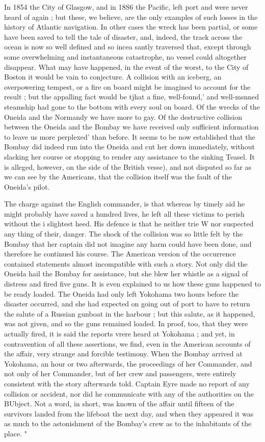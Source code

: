 \documentclass[justified]{tufte-book}
\begin{document}
In 1854 the City of Glasgow, and in 18S6 the Pacific, left port and were never heard of again ; but these, we believe, are the only examples of such losses in the history of Atlantic navigation. In other cases the wreck has been partial, or some have been saved to tell the tale of disaster, and, indeed, the track across the ocean is now so well defined and so incea santly traversed that, except through some overwhelming and instantaneous catastrophe, no vessel could altogether disappear. What may have happened, in the event of the worst, to the City of Boston it would be vain to conjecture. A collision with an iceberg, an overpowering tempest, or a fire on board might be imagined to account for the result ; but the appalling fact would be tjhat a fine, well-found,' and well-msnned steamship had gone to the bottom with every soul on board. Of the wrecks of the Oneida and the Normandy we have more to gay. Of the destructive collision between the Oneida and the Bombay we have received only sufficient information to leave us more perplexed' than before. It seems to be now established that the Bombay did indeed run into the Oneida and cut her down immediately, without slacking her course or stopping to render any assistance to the sinking Teasel. It is alleged, however, on the side of the British vesse), and not disputed so far as we can see by the Americans, that the
collision itself was the fault of the Oneida's pilot. 

The charge against the English commander, is that whereas by timely aid he might probably have saved a hundred lives, he left all these victims to perish without the i slightest heed. His defence is that he neither trie W nor suspected any thing of their, danger. The shock of the collision was so little felt by the Bombay that her captain did not imagine any harm could have been done, and therefore he continued his course. The American version of the occurrence contained statements almost incompatible with such a story. Not only did the Oneida hail the Bombay for assistance, but she blew her whistle as a signal of distress and fired five guns. It is even explained to us how these guns happened to be ready loaded. The Oneida had only left Yokohama two hours before the disaster occurred, and she had expected on going out of port to have to return the salute of a Russian gunboat in the harbour ; but this salute, as it happened, was not given, and so the guns remained loaded. In proof, too, that they were actually fired, it is said the reports vrere heard at Yokohama ; and yet, in contravention of all these assertions, we find, even in the American accounts of the affair, very strange and forcible testimony. When the Bombay arrived at Yokohama, an hour or two afterwards, the proceedings of her Commander, and not only of her Commander, but of her crew and passengers, were entirely consistent with the story afterwards told. Captain Eyre made no report of any collision or accident, nor did he communicate with any of the authorities on the BUbject. Not a word, in short, was known of the affair until fifteen of the survivors landed from the lifeboat the next day, and when they appeared it was as much to the astonishment of the Bombay's crew as to the inhabitants of the place. " 
\end{document}
